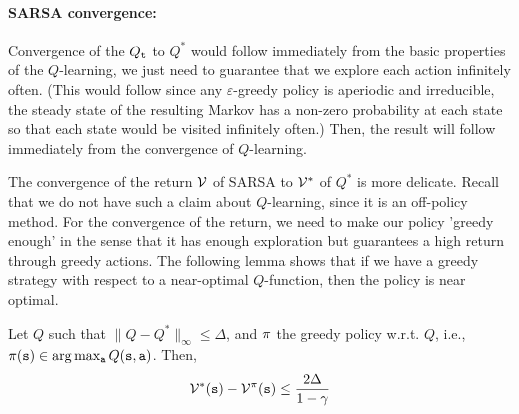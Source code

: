 \paragraph{SARSA convergence:}
Convergence of the $Q_{\tt t}$ to $Q^*$ would follow immediately from
the basic properties of the $Q$-learning, we just need to guarantee
that we explore each action infinitely often. (This would follow
since any $\varepsilon$-greedy policy is aperiodic and irreducible,
the steady state of the resulting Markov has a non-zero probability
at each state so that each state would be visited infinitely often.)
Then, the result will follow immediately from the convergence of
$Q$-learning.

The convergence of the return $\mathcal{V}$ of SARSA to $\mathcal{V}^{*}$ of $Q^*$ is more
delicate. Recall that we do not have such a claim about
$Q$-learning, since it is an off-policy method. For the convergence
of the return, we need to make our policy 'greedy enough' in the
sense that it has enough exploration but guarantees a high return
through greedy actions. The following lemma shows that if we
have a greedy strategy with respect to a near-optimal $Q$-function, 
then the policy is near optimal.

\begin{lemma}
\label{lemma:Q-greedy-policy}
%
Let $Q$ such that $\| Q-Q^*\|_\infty \leq \Delta$, and $\pi$ the
greedy policy w.r.t. $Q$, i.e., $\pi({\tt s})\in \arg\max_{\tt a}
Q({\tt s},{\tt a})$. Then,
\[\mathcal{V}^*({\tt s})-\mathcal{V}^\pi({\tt s})\leq
\frac{2\Delta}{1-\gamma}\]
\end{lemma}

